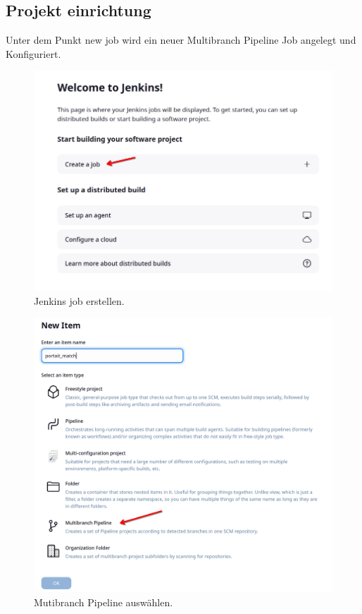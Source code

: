 \subsection{Projekt einrichtung}

Unter dem Punkt \glqq new job\grqq{} wird ein neuer Multibranch Pipeline Job angelegt und Konfiguriert.

\begin{figure}[H]
    \centering
    \includegraphics[scale=0.4]{res/Jenkins_01.png}
    \caption{Jenkins job erstellen.}
\end{figure}
\begin{figure}[H]
    \centering
    \includegraphics[scale=0.4]{res/Jenkins_02.png}
    \caption{Mutibranch Pipeline auswählen.}
\end{figure}


